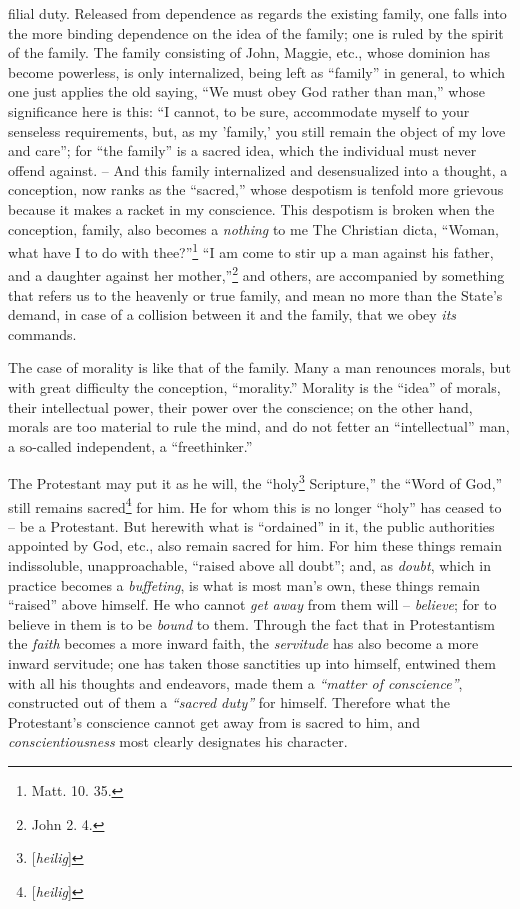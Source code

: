 \documentclass[12pt,a4paper]{book}
\begin{document}
filial duty. Released from dependence as regards the existing family, one 
falls into the more binding dependence on the idea of the family; one is ruled 
by the spirit of the family. The family consisting of John, Maggie, etc., 
whose dominion has become powerless, is only internalized, being left as 
``family'' in general, to which one just applies the old saying, ``We must 
obey God rather than man,'' whose significance here is this: ``I cannot, to 
be sure, accommodate myself to your senseless requirements, but, as my 
'family,' you still remain the object of my love and care''; for ``the 
family'' is a sacred idea, which the individual must never offend against. -- 
And this family internalized and desensualized into a thought, a conception, 
now ranks as the ``sacred,'' whose despotism is tenfold more grievous 
because it makes a racket in my conscience. This despotism is broken when the 
conception, family, also becomes a \textit{nothing} to me The Christian dicta, 
``Woman, what have I to do with thee?''\footnote{Matt. 10. 35.} ``I am come 
to stir up a man against his father, and a daughter against her 
mother,''\footnote{John 2. 4.} and others, are accompanied by something that 
refers us to the heavenly or true family, and mean no more than the State's 
demand, in case of a collision between it and the family, that we obey 
\textit{its} commands.

The case of morality is like that of the family. Many a man renounces morals, 
but with great difficulty the conception, ``morality.'' Morality is the 
``idea'' of morals, their intellectual power, their power over the 
conscience; on the other hand, morals are too material to rule the mind, and 
do not fetter an ``intellectual'' man, a so-called independent, a 
``freethinker.''

The Protestant may put it as he will, the ``holy\footnote{[\textit{heilig}]} 
Scripture,'' the ``Word of God,'' still remains 
sacred\footnote{[\textit{heilig}]} for him. He for whom this is no longer 
``holy'' has ceased to -- be a Protestant. But herewith what is 
``ordained'' in it, the public authorities appointed by God, etc., also 
remain sacred for him. For him these things remain indissoluble, 
unapproachable, ``raised above all doubt''; and, as \textit{doubt}, which in 
practice becomes a \textit{buffeting}, is what is most man's own, these things 
remain ``raised'' above himself. He who cannot \textit{get away} from them 
will -- \textit{believe}; for to believe in them is to be \textit{bound} to 
them. Through the fact that in Protestantism the \textit{faith} becomes a more 
inward faith, the \textit{servitude} has also become a more inward servitude; 
one has taken those sanctities up into himself, entwined them with all his 
thoughts and endeavors, made them a \textit{``matter of conscience''}, 
constructed out of them a \textit{``sacred duty''} for himself. Therefore 
what the Protestant's conscience cannot get away from is sacred to him, and 
\textit{conscientiousness} most clearly designates his character.
\end{document}
